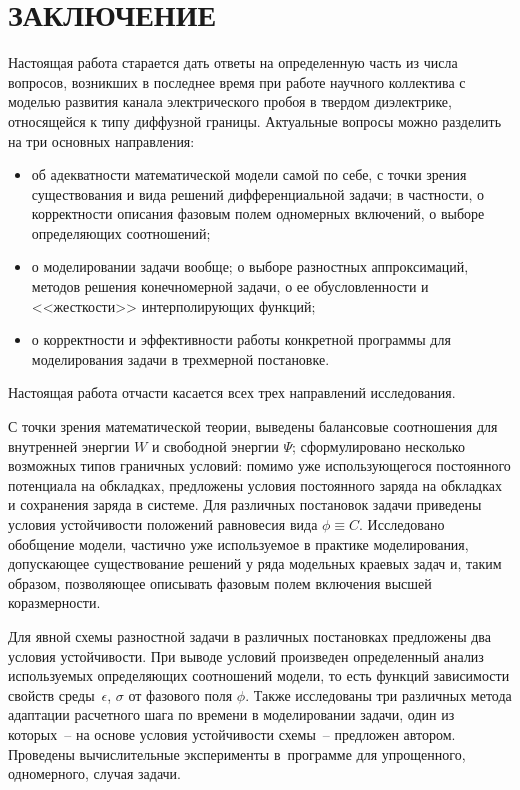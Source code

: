 
\section*{ЗАКЛЮЧЕНИЕ}

Настоящая работа старается дать ответы на определенную часть из числа вопросов, возникших в последнее время при работе научного коллектива с моделью развития канала электрического пробоя в твердом диэлектрике, относящейся к типу диффузной границы. Актуальные вопросы можно разделить на три основных направления:
\begin{itemize}
	\item об адекватности математической модели самой по себе, с точки зрения существования и вида решений дифференциальной задачи; в частности, о корректности описания фазовым полем одномерных включений, о выборе определяющих соотношений;
	\item о моделировании задачи вообще; о выборе разностных аппроксимаций, методов решения конечномерной задачи, о ее обусловленности и <<жесткости>> интерполирующих функций;
	\item о корректности и эффективности работы конкретной программы для моделирования задачи в трехмерной постановке.
\end{itemize}
Настоящая работа отчасти касается всех трех направлений исследования.

С точки зрения математической теории, выведены балансовые соотношения \linebreak для внутренней энергии $W$ и свободной энергии $\Psi$; сформулировано несколько возможных типов граничных условий: помимо уже использующегося постоянного потенциала на обкладках, предложены условия постоянного заряда на обкладках и сохранения заряда в системе. Для различных постановок задачи приведены условия устойчивости положений равновесия вида $\phi \equiv C$. Исследовано обобщение модели, частично уже используемое в практике моделирования, допускающее существование решений у ряда модельных краевых задач и, таким образом, позволяющее описывать фазовым полем включения высшей коразмерности.

Для явной схемы разностной задачи в различных постановках предложены два условия устойчивости. При выводе условий произведен определенный анализ используемых определяющих соотношений модели, то есть функций зависимости свойств среды~$\epsilon$, $\sigma$ от фазового поля $\phi$. Также исследованы три различных метода адаптации расчетного шага по времени в моделировании задачи, один из которых~-- на основе условия устойчивости схемы~-- предложен автором. Проведены вычислительные эксперименты в~программе для упрощенного, одномерного, случая задачи.

